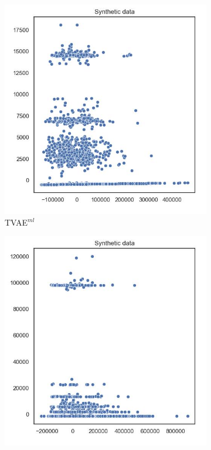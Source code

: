 \begin{figure}[h]
	\centering
	\begin{subfigure}{0.3\textwidth}
		\centering
		\includegraphics[width=\textwidth]{images/pca/tvae.jpg}
		\caption{TVAE$^{ml}$}
	\end{subfigure}
	\begin{subfigure}{0.3\textwidth}
		\centering
		\includegraphics[width=\textwidth]{images/pca/ctabgan.jpg}

\end{subfigure}
\end{figure}
